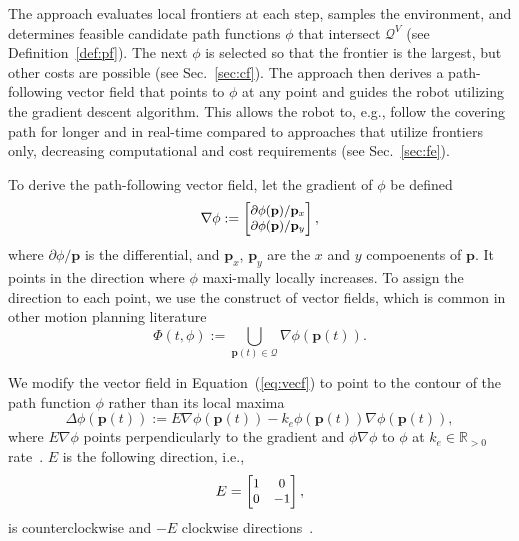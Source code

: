 \documentclass[lettersize,journal]{IEEEtran}
\theoremstyle{definition}
\begin{document}
The %
approach evaluates local frontiers at each step, samples the environment, and determines feasible candidate path functions $\phi$ that intersect $\mathcal{Q}^V$ (see Definition~\ref{def:pf}).
The next $\phi$ is selected so that the frontier is the largest, but other costs are possible (see Sec.~\ref{sec:cf}). 
The %
approach then derives a path-following vector field that points to $\phi$ at any point and guides the robot utilizing the gradient descent algorithm. This allows the robot to, e.g., follow the covering path for longer and in real-time compared to approaches that utilize frontiers only, decreasing computational and cost requirements (see Sec.~\ref{sec:fe}).

To derive the path-following vector field, let the gradient of $\phi$ be defined
\begin{equation}\small
  \nabla\phi:=\begin{bmatrix}
    \partial\phi(\mathbf{p})/\mathbf{p}_x\\
    \partial\phi(\mathbf{p})/\mathbf{p}_y
  \end{bmatrix},
\end{equation}
where $\partial\phi/\mathbf{p}$ is the differential, and $\mathbf{p}_x$, $\mathbf{p}_y$ are the $x$ and $y$ compoenents of $\mathbf{p}$.
It points in the direction where $\phi$ maxi-mally locally increases. To assign the direction to each point, we use the construct of vector fields, which is common in other motion planning literature~\cite{lavalle2006planning,garcia2017guidance,goncalves2010vector}
\begin{equation}\label{eq:vecf}
  \Phi(t,\phi):={\textstyle \bigcup\limits_{\mathbf{p}(t)\in\mathcal{Q}}}\nabla\phi(\mathbf{p}(t)).
\end{equation}

We modify the vector field in Equation~(\ref{eq:vecf}) to point to the contour of the path function $\phi$ rather than its local maxima
\begin{equation}\label{eq:pfvf}
  \Delta\phi(\mathbf{p}(t)):=E\nabla\phi(\mathbf{p}(t))-k_e\phi(\mathbf{p}(t))\nabla\phi(\mathbf{p}(t)),
\end{equation}
where $E\nabla\phi$ points perpendicularly to the gradient and $\phi\nabla\phi$ to $\phi$ at $k_e\in\mathbb{R}_{>0}$ rate~\cite{garcia2017guidance}. $E$ is the following direction, i.e.,
\begin{equation}\small
  E=\begin{bmatrix}
    1 & 0\\ 0 & -1
  \end{bmatrix},
\end{equation}
is counterclockwise and $-E$ clockwise directions~\cite{seewaldphdthesis}.
\end{document}
